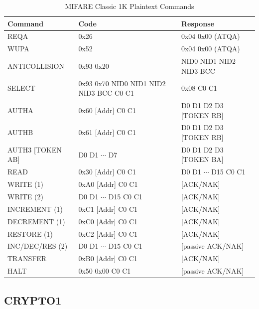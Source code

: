 \documentclass[fleqn,10pt]{SelfArx} %
\begin{document}
\begin{table}[ht]
\centering
\caption{MIFARE Classic 1K Plaintext Commands}
\label{tab:cmd1k}
\begin{tabular}{|l|l|l|}
\hline
\rowcolor[HTML]{E2F1F3} 
{\bf Command} 		&     {\bf Code} 						&    {\bf Response} 		\\ \hline
REQA 				&     0x26      						&    0x04  0x00 (ATQA) 		\\ \hline
WUPA 			&     0x52      						&    0x04  0x00 (ATQA) 		\\ \hline
ANTICOLLISION	  	&     0x93 0x20     						&    NID0 NID1 NID2 NID3 BCC   	\\ \hline
SELECT  			&     0x93 0x70  NID0 NID1 NID2 NID3 BCC C0 C1  	&    0x08 C0 C1			\\ \hline
AUTHA			&     0x60 [Addr] C0 C1					&    D0 D1 D2 D3  [TOKEN RB]    	\\ \hline
AUTHB			&     0x61 [Addr] C0 C1					&    D0 D1 D2 D3  [TOKEN RB]	\\ \hline
AUTH3 [TOKEN AB]		&     D0 D1 $\cdots$ D7					&    D0 D1 D2 D3  [TOKEN BA]	\\ \hline
READ 				&     0x30 [Addr] C0 C1					&    D0 D1 $\cdots$ D15 C0 C1    	\\ \hline
WRITE (1)			&     0xA0 [Addr] C0 C1 					&   [ACK/NAK]			\\ \hline
WRITE (2)			&     D0 D1 $\cdots$ D15 C0 C1				&   [ACK/NAK]			\\ \hline
INCREMENT (1)		&     0xC1 [Addr] C0 C1					&   [ACK/NAK]			\\ \hline
DECREMENT (1)		&     0xC0 [Addr] C0 C1					&   [ACK/NAK]			\\ \hline
RESTORE (1)			&     0xC2 [Addr] C0 C1					&   [ACK/NAK]			\\ \hline
INC/DEC/RES (2)		&     D0 D1 $\cdots$ D15 C0 C1				&   [passive ACK/NAK]		\\ \hline
TRANSFER			&     0xB0 [Addr] C0 C1					&   [ACK/NAK]			\\ \hline
HALT				&     0x50 0x00 C0 C1				       	&   [passive ACK/NAK]             	\\ \hline
\end{tabular}
\end{table}

\newpage
\subsection{CRYPTO1}
\label{app:crypto1}
\end{document}
